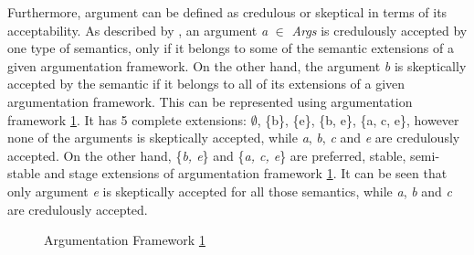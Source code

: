 Furthermore, argument can be defined as credulous or skeptical in terms of its acceptability. As described by \citet{arieli2015conflict}, an argument \textit{a} $\in$ \textit{Args} is credulously accepted by one type of semantics, only if it belongs to some of the semantic extensions of a given argumentation framework. On the other hand, the argument \textit{b} is skeptically accepted by the semantic if it belongs to all of its extensions of a given argumentation framework. This can be represented using argumentation framework \ref{fig:af5}. It has 5 complete extensions: $\emptyset$, \{b\}, \{e\}, \{b, e\}, \{a, c, e\}, however none of the arguments is skeptically accepted, while \textit{a}, \textit{b}, \textit{c} and \textit{e} are credulously accepted. On the other hand, \{\textit{b, e}\} and \{\textit{a, c, e}\} are preferred, stable, semi-stable and stage extensions of argumentation framework \ref{fig:af5}. It can be seen that only argument \textit{e} is skeptically accepted for all those semantics, while \textit{a}, \textit{b} and \textit{c} are credulously accepted.

\begin{figure}[h]
\centering
{}
\caption{Argumentation Framework \ref{fig:af5}}
\label{fig:af5}
\end{figure}